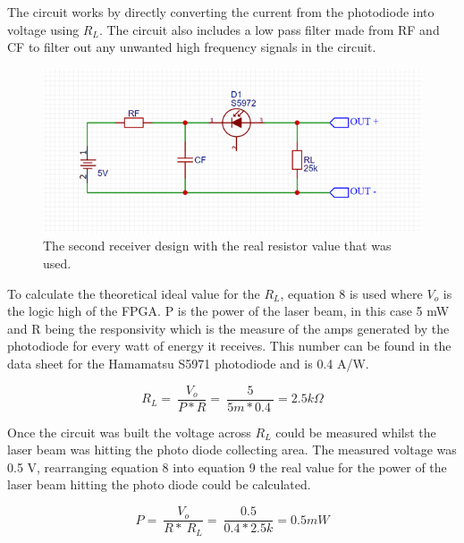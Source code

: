 \documentclass[conference]{IEEEtran}
\begin{document}
The circuit works by directly converting the current from the photodiode into voltage using  $R_{L}$. The circuit also includes a low pass filter made from RF and CF to filter out any unwanted high frequency signals in the circuit. 
\\
\begin{figure}[h!]
\includegraphics[width=\linewidth]{fig 7.png}\par
\caption{The second receiver design with the real resistor value that was used.}
\label{fig}
\end{figure}

To calculate the theoretical ideal value for the $R_{L}$, equation 8 is used where $V_{o}$ is the logic high of the FPGA. P is the power of the laser beam, in this case 5 mW and R being the responsivity which is the measure of the amps generated by the photodiode for every watt of energy it receives. This number can be found in the data sheet for the Hamamatsu S5971 photodiode and is 0.4 A/W.

\begin{equation}
R_L=\ \frac{V_o}{P*R}=\ \frac{5}{5m*0.4\ }=2.5k\Omega{}
\end{equation}

Once the circuit was built the voltage across $R_{L}$ could be measured whilst the laser beam was hitting the photo diode collecting area. The measured voltage was 0.5 V, rearranging equation 8 into equation 9 the real value for the power of the laser beam hitting the photo diode could be calculated. 

\begin{equation}
P=\ \frac{V_o}{R*\ R_L}=\ \frac{0.5}{0.4*2.5k}=0.5mW
\end{equation}
\end{document}
